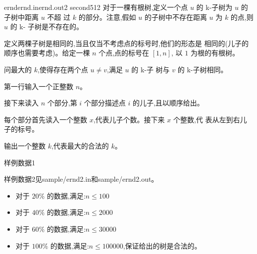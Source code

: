 \documentclass[11pt,a4paper,oneside]{article}
\begin{document}
\begin{problem}{ernd}{ernd.in}{ernd.out}{2 second}{512}
	对于一棵有根树,定义一个点 $u$ 的 k-子树为 $u$ 的子树中距离 $u$ 不超
	过 $k$ 的部分。注意,假如 $u$ 的子树中不存在距离 $u$ 为 $k$ 的点,则 $u$ 的 k-
	子树是不存在的。
	
	定义两棵子树是相同的,当且仅当不考虑点的标号时,他们的形态是
	相同的(儿子的顺序也需要考虑)。给定一棵 $n$ 个点,点的标号在 $[1, n]$,
	以 $1$ 为根的有根树。
	
	问最大的 $k$,使得存在两个点 $u\neq v$,满足 $u$ 的 k-子
	树与 $v$ 的 k-子树相同。

	\InputFile
	
	第一行输入一个正整数 $n$。
	
	接下来读入 $n$ 个部分,第 $i$ 个部分描述点 $i$ 的儿子,且以顺序给出。
	
	每个部分首先读入一个整数 $x$,代表儿子个数。接下来 $x$ 个整数,代
	表从左到右儿子的标号。
	
	\OutputFile
	
	输出一个整数 $k$,代表最大的合法的 $k$。
	
	\Example
	
	样例数据1
	
	\begin{example}
	\end{example}
	
	样例数据2见sample/ernd2.in和sample/ernd2.out。
	
	\Note
	
	\begin{itemize}
		\item 对于 $20\%$ 的数据,满足:$n \leq 100$
		\item 对于 $40\%$ 的数据,满足:$n \leq 2000$
		\item 对于 $60\%$ 的数据,满足:$n \leq 30000$
		\item 对于 $100\%$ 的数据,满足:$n \leq 100000$,保证给出的树是合法的。
	\end{itemize}
	
\end{problem}
\end{document}
